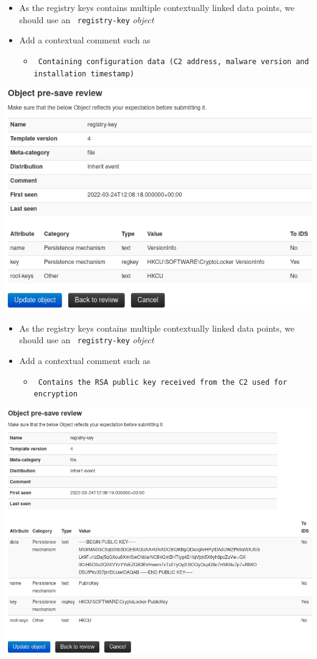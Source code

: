 \begin{frame}
    \begin{itemize}
        \item As the registry keys contains multiple contextually linked data points, we should use an \texttt{\color{black} registry-key} \textit{object}
        \item Add a contextual comment such as
        \begin{itemize}
            \item \texttt{\color{black} Containing configuration data (C2 address, malware version and installation timestamp)}
        \end{itemize}
    \end{itemize}
    \begin{center}
        \includegraphics[width=0.55\linewidth]{pictures/case2/object-registry-config.png}
    \end{center}
\end{frame}

\begin{frame}
    \begin{itemize}
        \item As the registry keys contains multiple contextually linked data points, we should use an \texttt{\color{black} registry-key} \textit{object}
        \item Add a contextual comment such as
        \begin{itemize}
            \item \texttt{\color{black} Contains the RSA public key received from the C2 used for encryption}
        \end{itemize}
    \end{itemize}
    \begin{center}
        \includegraphics[width=0.55\linewidth]{pictures/case2/object-registry-pb.png}
    \end{center}
\end{frame}

